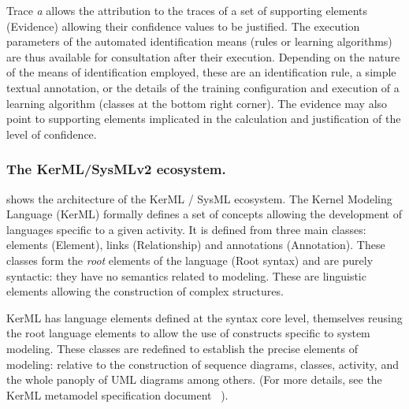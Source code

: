 Trace \textit{a} allows the attribution to the traces of a set of supporting elements (Evidence) allowing their confidence values to be justified. The execution parameters of the automated identification means (rules or learning algorithms) are thus available for consultation after their execution. Depending on the nature of the means of identification employed, these are an identification rule, a simple textual annotation, or the details of the training configuration and execution of a learning algorithm (classes at the bottom right corner). The evidence may also point to supporting elements implicated in the calculation and justification of the level of confidence.






\subsubsection{The KerML/SysMLv2 ecosystem.}
 shows the architecture of the KerML / SysML ecosystem. The Kernel Modeling Language (KerML) formally defines a set of concepts allowing the development of languages specific to a given activity. It is defined from three main classes: elements (Element), links (Relationship) and annotations (Annotation). These classes form the \textit{root} elements of the language (Root syntax) and are purely syntactic: they have no semantics related to modeling. These are linguistic elements allowing the construction of complex structures.
  
KerML has language elements defined at the syntax core level, themselves reusing the root language elements to allow the use of constructs specific to system modeling. These classes are redefined to establish the precise elements of modeling: relative to the construction of sequence diagrams, classes, activity, and the whole panoply of UML diagrams among others. (For more details, see the KerML metamodel specification document ~\cite{kerML}).

